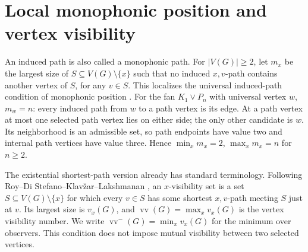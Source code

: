 \documentclass[11pt]{article}
\theoremstyle{remark}\newtheorem{remark}[theorem]{Remark}
\newcommand{\vv}{\operatorname{vv}}
\newcommand{\vvm}{\operatorname{vv}^{-}}
\begin{document}
\section{Local monophonic position and vertex visibility}
An induced path is also called a monophonic path. For $|V(G)|\ge2$, let
$m_x$ be the largest size of $S\subseteq V(G)\setminus\{x\}$ such that no
induced $x,v$-path contains another vertex of $S$, for any $v\in S$.
This localizes the universal induced-path condition of monophonic position
\cite{monophonic}. For the fan $K_1\vee P_n$ with universal vertex $w$,
$m_w=n$: every induced path from $w$ to a path vertex is its edge.
At a path vertex at most one selected path vertex lies on either side;
the only other candidate is $w$. Its neighborhood is an admissible set,
so path endpoints have value two and internal path vertices have value
three. Hence $\min_xm_x=2$, $\max_xm_x=n$ for $n\ge2$.

The existential shortest-path version already has standard terminology.
Following Roy--Di Stefano--Klav\v{z}ar--Lakshmanan
\cite{visibility}, an $x$-visibility set is a set
$S\subseteq V(G)\setminus\{x\}$ for which every $v\in S$ has some shortest
$x,v$-path meeting $S$ just at $v$. Its largest size is $v_x(G)$, and
$\vv(G)=\max_xv_x(G)$ is the vertex visibility number. We write
$\vvm(G)=\min_xv_x(G)$ for the minimum over observers. This condition does
not impose mutual visibility between two selected vertices.
\end{document}
